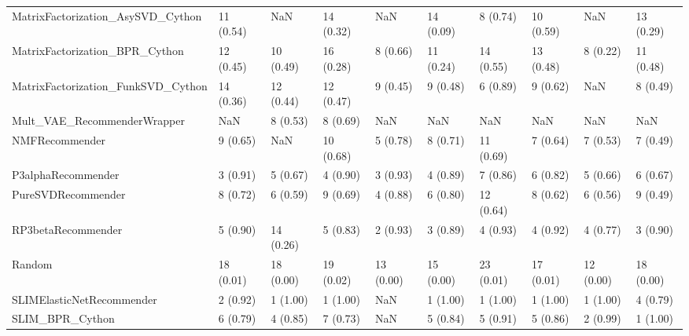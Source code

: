 \begin{tabular}{llllllllll}
  MatrixFactorization\_AsySVD\_Cython &                11 (0.54) &         NaN &     14 (0.32) &          NaN &            14 (0.09) &            8 (0.74) &         10 (0.59) &                NaN &         13 (0.29) \\
     MatrixFactorization\_BPR\_Cython &                12 (0.45) &   10 (0.49) &     16 (0.28) &     8 (0.66) &            11 (0.24) &           14 (0.55) &         13 (0.48) &           8 (0.22) &         11 (0.48) \\
 MatrixFactorization\_FunkSVD\_Cython &                14 (0.36) &   12 (0.44) &     12 (0.47) &     9 (0.45) &             9 (0.48) &            6 (0.89) &          9 (0.62) &                NaN &          8 (0.49) \\
        Mult\_VAE\_RecommenderWrapper &                      NaN &    8 (0.53) &      8 (0.69) &          NaN &                  NaN &                 NaN &               NaN &                NaN &               NaN \\
                     NMFRecommender &                 9 (0.65) &         NaN &     10 (0.68) &     5 (0.78) &             8 (0.71) &           11 (0.69) &          7 (0.64) &           7 (0.53) &          7 (0.49) \\
                 P3alphaRecommender &                 3 (0.91) &    5 (0.67) &      4 (0.90) &     3 (0.93) &             4 (0.89) &            7 (0.86) &          6 (0.82) &           5 (0.66) &          6 (0.67) \\
                 PureSVDRecommender &                 8 (0.72) &    6 (0.59) &      9 (0.69) &     4 (0.88) &             6 (0.80) &           12 (0.64) &          8 (0.62) &           6 (0.56) &          9 (0.49) \\
                 RP3betaRecommender &                 5 (0.90) &   14 (0.26) &      5 (0.83) &     2 (0.93) &             3 (0.89) &            4 (0.93) &          4 (0.92) &           4 (0.77) &          3 (0.90) \\
                             Random &                18 (0.01) &   18 (0.00) &     19 (0.02) &    13 (0.00) &            15 (0.00) &           23 (0.01) &         17 (0.01) &          12 (0.00) &         18 (0.00) \\
          SLIMElasticNetRecommender &                 2 (0.92) &    1 (1.00) &      1 (1.00) &          NaN &             1 (1.00) &            1 (1.00) &          1 (1.00) &           1 (1.00) &          4 (0.79) \\
                    SLIM\_BPR\_Cython &                 6 (0.79) &    4 (0.85) &      7 (0.73) &          NaN &             5 (0.84) &            5 (0.91) &          5 (0.86) &           2 (0.99) &          1 (1.00) \\

\end{tabular}
